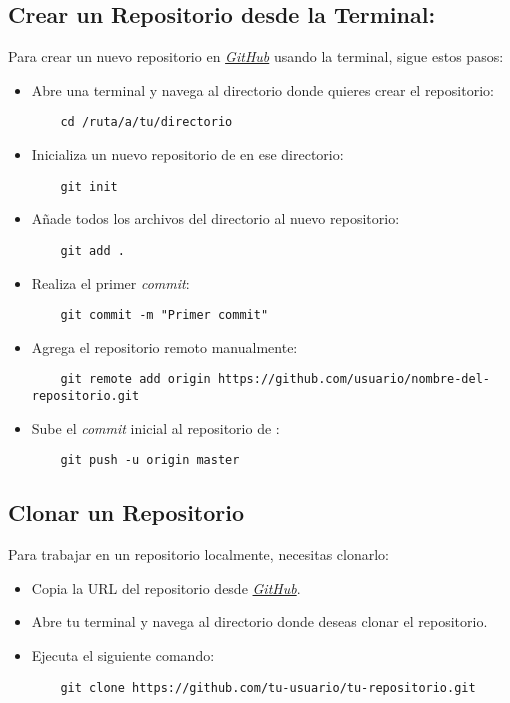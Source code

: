 \documentclass{template/uem_theme}
\begin{document}
\subsection{Crear un Repositorio desde la Terminal:}

Para crear un nuevo repositorio en \href{https://github.com}{\textit{GitHub}} usando la terminal, sigue estos pasos:

\begin{itemize}
    \item Abre una terminal y navega al directorio donde quieres crear el repositorio:
    \begin{verbatim}
    cd /ruta/a/tu/directorio
    \end{verbatim}
    \item Inicializa un nuevo repositorio de \git en ese directorio:
    \begin{verbatim}
    git init
    \end{verbatim}
    \item Añade todos los archivos del directorio al nuevo repositorio:
    \begin{verbatim}
    git add .
    \end{verbatim}
    \item Realiza el primer \textit{commit}:
    \begin{verbatim}
    git commit -m "Primer commit"
    \end{verbatim}
    \item Agrega el repositorio remoto manualmente:
    \begin{verbatim}
    git remote add origin https://github.com/usuario/nombre-del-repositorio.git
    \end{verbatim}
    \item Sube el \textit{commit} inicial al repositorio de \github:
    \begin{verbatim}
    git push -u origin master
    \end{verbatim}
\end{itemize}

\subsection{Clonar un Repositorio}
Para trabajar en un repositorio localmente, necesitas clonarlo:
\begin{itemize}
    \item Copia la URL del repositorio desde \href{https://github.com}{\textit{GitHub}}.
    \item Abre tu terminal y navega al directorio donde deseas clonar el repositorio.
    \item Ejecuta el siguiente comando:
    \begin{verbatim}
    git clone https://github.com/tu-usuario/tu-repositorio.git
    \end{verbatim}
\end{itemize}
\end{document}
